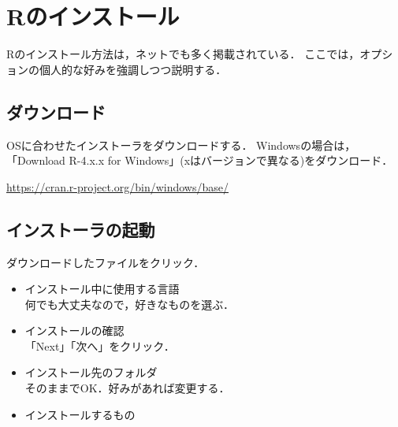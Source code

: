 \documentclass[
]{article}
\author{}
\date{\vspace{-2.5em}}
\providecommand{\tightlist}{%
  \setlength{\itemsep}{0pt}\setlength{\parskip}{0pt}}
\begin{document}
{
\setcounter{tocdepth}{2}
\tableofcontents
}
\hypertarget{install}{%
\section{Rのインストール}\label{install}}

Rのインストール方法は，ネットでも多く掲載されている．
ここでは，オプションの個人的な好みを強調しつつ説明する．

\hypertarget{ux30c0ux30a6ux30f3ux30edux30fcux30c9}{%
\subsection{ダウンロード}\label{ux30c0ux30a6ux30f3ux30edux30fcux30c9}}

OSに合わせたインストーラをダウンロードする．
Windowsの場合は，「Download R-4.x.x for Windows」(xはバージョンで異なる)をダウンロード．

\url{https://cran.r-project.org/bin/windows/base/}

\hypertarget{ux30a4ux30f3ux30b9ux30c8ux30fcux30e9ux306eux8d77ux52d5}{%
\subsection{インストーラの起動}\label{ux30a4ux30f3ux30b9ux30c8ux30fcux30e9ux306eux8d77ux52d5}}

ダウンロードしたファイルをクリック．

\begin{itemize}
\tightlist
\item
  インストール中に使用する言語\\
  何でも大丈夫なので，好きなものを選ぶ．
\end{itemize}

\begin{itemize}
\tightlist
\item
  インストールの確認\\
  「Next」「次へ」をクリック．
\end{itemize}

\begin{itemize}
\tightlist
\item
  インストール先のフォルダ\\
  そのままでOK．好みがあれば変更する．
\end{itemize}

\begin{itemize}
\tightlist
\item
  インストールするもの
\end{itemize}
\end{document}
